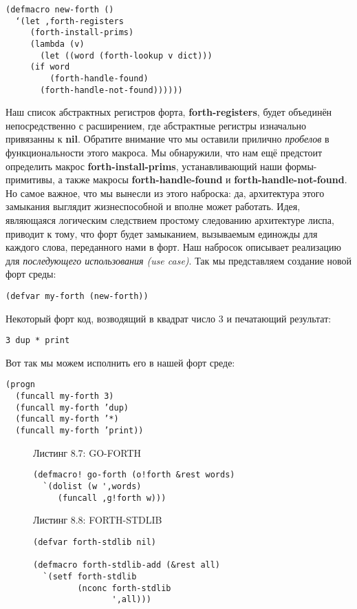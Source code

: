 \begin{verbatim}
(defmacro new-forth ()
  ‘(let ,forth-registers
     (forth-install-prims)
     (lambda (v)
       (let ((word (forth-lookup v dict)))
	 (if word
	     (forth-handle-found)
	   (forth-handle-not-found))))))
\end{verbatim}

Наш список абстрактных регистров форта, \textbf{forth-registers}, будет объединён непосредственно с расширением, где абстрактные регистры изначально привязанны к \textbf{nil}. Обратите внимание что мы оставили прилично \emph{пробелов} в функциональности этого макроса. Мы обнаружили, что нам ещё предстоит определить макрос \textbf{forth-install-prims}, устанавливающий наши формы-примитивы, а также макросы \textbf{forth-handle-found} и \textbf{forth-handle-not-found}. Но самое важное, что мы вынесли из этого наброска: да, архитектура этого замыкания выглядит жизнеспособной и вполне может работать. Идея, являющаяся логическим следствием простому следованию архитектуре лиспа, приводит к тому, что форт будет замыканием, вызываемым единожды для каждого слова, переданного нами в форт. Наш набросок описывает реализацию для \emph{последующего использования (use case)}. Так мы представляем создание новой форт среды:

\begin{verbatim}
(defvar my-forth (new-forth))
\end{verbatim}

Некоторый форт код, возводящий в квадрат число 3 и печатающий результат:

\begin{verbatim}
3 dup * print
\end{verbatim}

Вот так мы можем исполнить его в нашей форт среде:

\begin{verbatim}
(progn
  (funcall my-forth 3)
  (funcall my-forth ’dup)
  (funcall my-forth ’*)
  (funcall my-forth ’print))
\end{verbatim}

\begin{figure}Листинг 8.7: GO-FORTH\label{listing_8.7}
\listbegin
\begin{verbatim}
(defmacro! go-forth (o!forth &rest words)
  `(dolist (w ',words)
     (funcall ,g!forth w)))
\end{verbatim}
\listend
\end{figure}

\begin{figure}Листинг 8.8: FORTH-STDLIB\label{listing_8.8}
\listbegin
\begin{verbatim}
(defvar forth-stdlib nil)

(defmacro forth-stdlib-add (&rest all)
  `(setf forth-stdlib
         (nconc forth-stdlib
                ',all)))
\end{verbatim}
  \listend
\end{figure}

